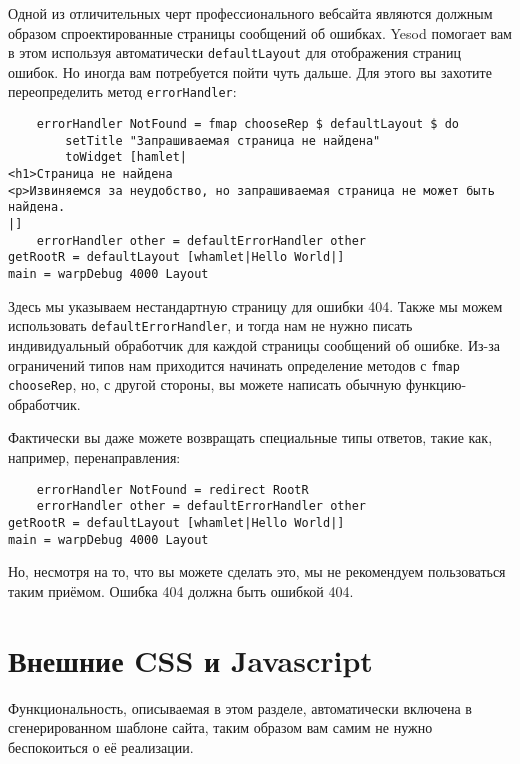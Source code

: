 Одной из отличительных черт профессионального вебсайта являются должным образом спроектированные страницы сообщений об ошибках. Yesod помогает вам в этом используя автоматически \lstinline!defaultLayout! для отображения страниц ошибок. Но иногда вам потребуется пойти чуть дальше. Для этого вы захотите переопределить метод \lstinline!errorHandler!:

\begin{lstlisting}
    errorHandler NotFound = fmap chooseRep $ defaultLayout $ do
        setTitle "Запрашиваемая страница не найдена"
        toWidget [hamlet|
<h1>Страница не найдена
<p>Извиняемся за неудобство, но запрашиваемая страница не может быть найдена.
|]
    errorHandler other = defaultErrorHandler other
getRootR = defaultLayout [whamlet|Hello World|]
main = warpDebug 4000 Layout
\end{lstlisting}

Здесь мы указываем нестандартную страницу для ошибки 404. Также мы можем использовать \lstinline!defaultErrorHandler!, и тогда нам не нужно писать индивидуальный обработчик для каждой страницы сообщений об ошибке. Из-за ограничений типов нам приходится начинать определение методов с \lstinline!fmap chooseRep!, но, с другой стороны, вы можете написать обычную функцию-обработчик.

Фактически вы даже можете возвращать специальные типы ответов, такие как, например, перенаправления:

\begin{lstlisting}
    errorHandler NotFound = redirect RootR
    errorHandler other = defaultErrorHandler other
getRootR = defaultLayout [whamlet|Hello World|]
main = warpDebug 4000 Layout
\end{lstlisting}

\begin{remark}
Но, несмотря на то, что вы можете сделать это, мы не рекомендуем пользоваться таким приёмом. Ошибка 404 должна быть ошибкой 404.
\end{remark}

\section {Внешние CSS и Javascript}

\begin{remark}
Функциональность, описываемая в этом разделе, автоматически включена в сгенерированном шаблоне сайта, таким образом вам самим не нужно беспокоиться о её реализации.
\end{remark}

